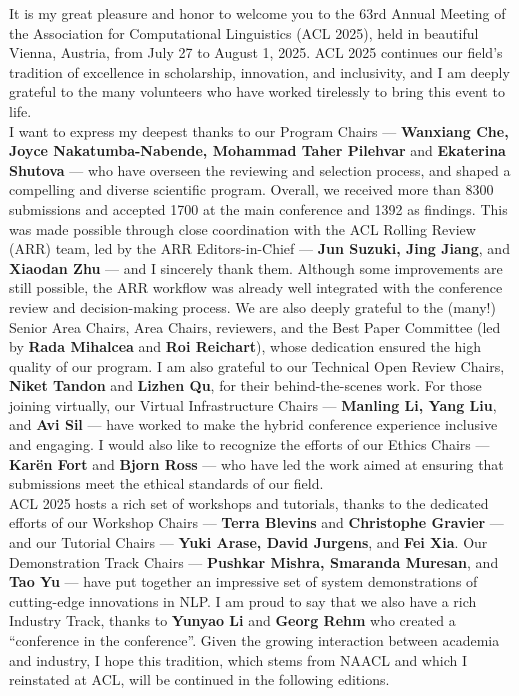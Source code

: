 It is my great pleasure and honor to welcome you to the 63rd Annual Meeting of the Association for Computational Linguistics (ACL 2025), held in beautiful Vienna, Austria, from July 27 to August 1, 2025. ACL 2025 continues our field’s tradition of excellence in scholarship, innovation, and inclusivity, and I am deeply grateful to the many volunteers who have worked tirelessly to bring this event to life.\\


I want to express my deepest thanks to our Program Chairs	--- \textbf{Wanxiang Che, Joyce Nakatumba-Nabende, Mohammad Taher Pilehvar} and \textbf{Ekaterina Shutova} --- who have overseen the reviewing and selection process, and shaped a compelling and diverse scientific program. Overall, we received more than 8300 submissions and accepted 1700 at the main conference and 1392 as findings. This was made possible through close coordination with the ACL Rolling Review (ARR) team, led by the ARR Editors-in-Chief --- \textbf{Jun Suzuki, Jing Jiang}, and \textbf{Xiaodan Zhu} --- and I sincerely thank them. Although some improvements are still possible, the ARR workflow was already well integrated with the conference review and decision-making process. We are also deeply grateful to the (many!) Senior Area Chairs, Area Chairs, reviewers, and the Best Paper Committee (led by \textbf{Rada Mihalcea} and \textbf{Roi Reichart}), whose dedication ensured the high quality of our program. I am also grateful to our Technical Open Review Chairs, \textbf{Niket Tandon} and \textbf{Lizhen Qu}, for their behind-the-scenes work. For those joining virtually, our Virtual Infrastructure Chairs --- \textbf{Manling Li, Yang Liu}, and \textbf{Avi Sil} --- have worked to make the hybrid conference experience inclusive and engaging. I would also like to recognize the efforts of our Ethics Chairs --- \textbf{Karën Fort} and \textbf{Bjorn Ross} --- who have led the work aimed at ensuring that submissions meet the ethical standards of our field. \\


ACL 2025 hosts a rich set of workshops and tutorials, thanks to the dedicated efforts of our Workshop Chairs 	--- \textbf{Terra Blevins} and \textbf{Christophe Gravier} --- and our Tutorial Chairs --- \textbf{Yuki Arase, David Jurgens}, and \textbf{Fei Xia}. Our Demonstration Track Chairs --- \textbf{Pushkar Mishra, Smaranda Muresan}, and \textbf{Tao Yu} --- have put together an impressive set of system demonstrations of cutting-edge innovations in NLP. I am proud to say that we also have a rich Industry Track, thanks to \textbf{Yunyao Li} and \textbf{Georg Rehm} who created a “conference in the conference”. Given the growing interaction between academia and industry, I hope this tradition, which stems from NAACL and which I reinstated at ACL, will be continued in the following editions.\\


